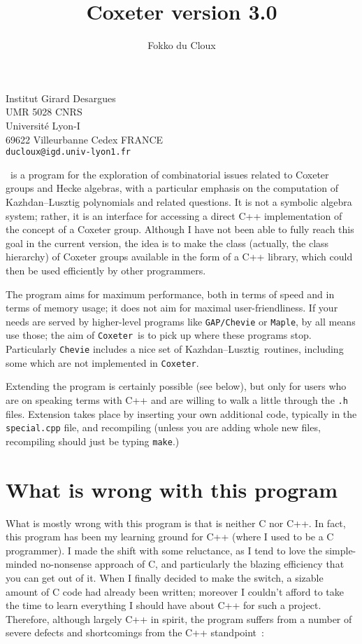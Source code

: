 \documentclass[11pt]{article}
\newcommand{\coxeter}{{\tt Coxeter}}
\newcommand{\kl}{Kazh\-dan--Lusz\-tig}
\newcommand{\klpol}{Kazh\-dan--Lusz\-tig po\-ly\-no\-mial}
\begin{document}
\title{Coxeter version 3.0}
\author{Fokko du Cloux}

\maketitle

\begin{flushleft}
Institut Girard Desargues\\
UMR 5028 CNRS\\
Universit\'e Lyon-I\\
69622 Villeurbanne Cedex FRANCE\\
{\tt ducloux@igd.univ-lyon1.fr}
\end{flushleft}

\noindent\coxeter\ is a program for the exploration of combinatorial issues 
related to Coxeter groups and Hecke algebras, with a particular emphasis on
the computation of \klpol s and related questions. It is not a symbolic
algebra system; rather, it is an interface for accessing a direct C++
implementation of the concept of a Coxeter group. Although I have not been
able to fully reach this goal in the current version, the idea is to make the
class (actually, the class hierarchy) of Coxeter groups available in the
form of a C++ library, which could then be used efficiently by other 
programmers.

The program aims for maximum performance, both in terms of speed and in terms
of memory usage; it does not aim for maximal user-friendliness. If your needs
are served by higher-level programs like {\tt GAP/Chevie} or {\tt Maple}, by
all means use those; the aim of \coxeter\ is to pick up where these programs
stop. Particularly {\tt Chevie} includes a nice set of \kl\ routines,
including some which are not implemented in \coxeter. 

Extending the
program is certainly possible (see below), but only for users who are on 
speaking terms with C++ and are willing to walk a little through the {\tt .h}
files. Extension takes place by inserting your own additional code, typically
in the {\tt special.cpp} file, and recompiling (unless you are adding whole
new files, recompiling should just be typing {\tt make}.)

\section{What is wrong with this program}\label{section:wrong}

What is mostly wrong with this program is that is neither C nor C++. In fact,
this program has been my learning ground for C++ (where I used to be a C
programmer). I made the shift with some reluctance, as I tend to love the
simple-minded no-nonsense approach of C, and particularly the blazing
efficiency that you can get out of it. When I finally decided to make the
switch, a sizable amount of C code had already been written; moreover I
couldn't afford to take the time to learn everything I should have about C++
for such a project. Therefore, although largely C++ in spirit, the program
suffers from a number of severe defects and shortcomings from the C++
standpoint~:
\end{document}
